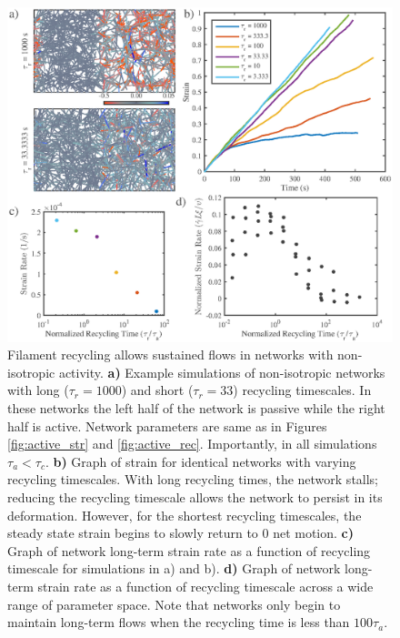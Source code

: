 \documentclass[10pt,letterpaper]{article}
\begin{document}
\begin{figure}[h!]
	\centering
	\includegraphics[width=\hsize]{figures/figure6a}
	\caption{\label{fig:flow_ex}  Filament recycling allows sustained flows in networks with non-isotropic activity. \textbf{a)} Example simulations of non-isotropic networks with long ($\tau_r=1000$) and short ($\tau_r=33$) recycling timescales. In these networks the left half of the network is passive while the right half is active.  Network parameters are same as in Figures \ref{fig:active_str} and \ref{fig:active_rec}. Importantly, in all simulations $\tau_a<\tau_c$. \textbf{b)} Graph of strain for identical networks with varying recycling timescales.  With long recycling times, the network stalls; reducing the recycling timescale allows the network to persist in its deformation.  However, for the shortest recycling timescales, the steady state strain begins to slowly return to 0 net motion.  \textbf{c)} Graph of network long-term strain rate as a function of recycling timescale for simulations in a) and b). \textbf{d)} Graph of network long-term strain rate as a function of recycling timescale across a wide range of parameter space.  Note that networks only begin to maintain long-term flows when the recycling time is less than $100\tau_a$. }
\end{figure}
\end{document}
